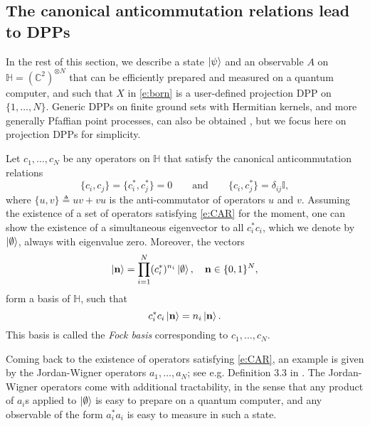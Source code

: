 \subsection{The canonical anticommutation relations lead to DPPs}

In the rest of this section, we describe a state $\ket{\psi}$ and an observable $A$ on $\mathbb{H} = (\mathbb{C}^2)^{\otimes N}$ that can be efficiently prepared and measured on a quantum computer, and such that $X$ in \eqref{e:born} is a user-defined projection DPP on $\{1, \dots, N\}$.
Generic DPPs on finite ground sets with Hermitian kernels, and more generally Pfaffian point processes, can also be obtained \cite{BaFaFe24}, but we focus here on projection DPPs for simplicity.

Let $c_1, \dots, c_N$ be any operators on $\mathbb{H}$ that satisfy the canonical anticommutation relations
\begin{equation}
        \label{e:CAR}
        \lbrace c_i,c_j \rbrace = \lbrace c^*_i,c^*_j \rbrace  = 0
        \qquad \text{and} \qquad
        \lbrace c_i,c^*_j \rbrace = \delta_{ij} \mathbb{I},
\end{equation}
where $\{u,v\} \triangleq uv+vu$ is the anti-commutator of operators $u$ and $v$.   
Assuming the existence of a set of operators satisfying \eqref{e:CAR} for the moment, one can show \cite{Nie05} the existence of a simultaneous eigenvector to all $c_i^*c_i$, which we denote by $\ket{\emptyset}$, always with eigenvalue zero. Moreover, the vectors 
$$
    \ket{\mathbf{n}} = \prod_{i=1}^N (c_i^*)^{n_i}\ket{\emptyset}, \quad \mathbf{n}\in\{0,1\}^N, 
$$
form a basis of $\mathbb{H}$, such that 
$$
    c_i^* c_i \ket{\mathbf{n}} = n_i\ket{\mathbf{n}}.
$$
This basis is called the \emph{Fock basis} corresponding to $c_1, \dots, c_N$. 

Coming back to the existence of operators satisfying \eqref{e:CAR}, an example is given by the Jordan-Wigner operators $a_1, \dots, a_N$; see e.g. Definition 3.3 in \cite{BaFaFe24}. 
The Jordan-Wigner operators come with additional tractability, in the sense that any product of $a_i$s applied to $\ket{\emptyset}$ is easy to prepare on a quantum computer, and any observable of the form $a_i^*a_i$ is easy to measure in such a state. 

